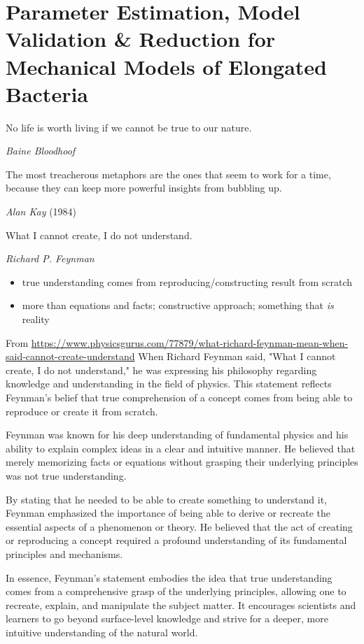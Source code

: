 \chapter{Parameter Estimation, Model Validation \& Reduction for Mechanical Models of
Elongated Bacteria}
\label{chapter:bacterial-rods}

\epigraph{No life is worth living if we cannot be true to our nature.}
{\textit{Baine Bloodhoof}}

\epigraph{The most treacherous metaphors are the ones that seem to work for a
time, because they can keep more powerful insights from bubbling up.}
{\textit{Alan Kay} (1984)}

\epigraph{What I cannot create, I do not understand.}
{\textit{Richard P. Feynman}}

\begin{itemize}
    \item true understanding comes from reproducing/constructing result from scratch
    \item more than equations and facts; constructive approach; something that \textit{is} reality
\end{itemize}

From
\url{https://www.physicsgurus.com/77879/what-richard-feynman-mean-when-said-cannot-create-understand}
When Richard Feynman said, "What I cannot create, I do not understand," he was
expressing his philosophy regarding knowledge and understanding in the field of
physics. This statement reflects Feynman's belief that true comprehension of a
concept comes from being able to reproduce or create it from scratch.

Feynman was known for his deep understanding of fundamental physics and his
ability to explain complex ideas in a clear and intuitive manner. He believed
that merely memorizing facts or equations without grasping their underlying
principles was not true understanding.

By stating that he needed to be able to create something to understand it,
Feynman emphasized the importance of being able to derive or recreate the
essential aspects of a phenomenon or theory. He believed that the act of
creating or reproducing a concept required a profound understanding of its
fundamental principles and mechanisms.

In essence, Feynman's statement embodies the idea that true understanding comes
from a comprehensive grasp of the underlying principles, allowing one to
recreate, explain, and manipulate the subject matter. It encourages scientists
and learners to go beyond surface-level knowledge and strive for a deeper, more
intuitive understanding of the natural world.

